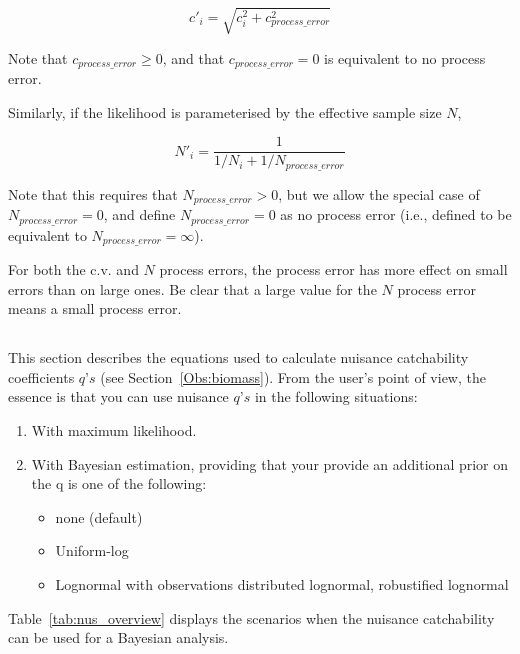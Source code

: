 {{{{\begin{equation}
  c'_i  = \sqrt {c_i^2  + c_{process\_error}^2 } 
\end{equation}

Note that $c_{process\_ error} \ge 0$, and that $c_{process\_ error} = 0$ is equivalent to no process error.

Similarly, if the likelihood is parameterised by the effective sample size $N$,

\begin{equation}
 N'_i  = \frac{1}{1 / {N_i}+ 1 / N_{process\_error}}
\end{equation}

Note that this requires that $N_{process\_ error} > 0$, but we allow the special case of $N_{process\_ error}=0$, and define $N_{process\_ error}=0$ as no process error (i.e., defined to be equivalent to $N_{process\_ error}=\infty$). 

For both the c.v. and $N$ process errors, the process error has more effect on small errors than on large ones. Be clear that a large value for the $N$ process error means a small process error.

\subsection{}\label{subsec:nuisance}
This section describes the equations used to calculate nuisance catchability coefficients $q’s$ (see Section~\ref{Obs:biomass}). From the user's point of view, the essence is that you can use nuisance $q’s$ in the following situations:
\begin{enumerate}
	\item With maximum likelihood.
	\item With Bayesian estimation, providing that your provide an additional prior on the q is one of the following:
		\begin{itemize} 
			\item none (default)
			\item Uniform-log
			\item Lognormal with observations distributed lognormal, robustified lognormal
		\end{itemize}
\end{enumerate}
Table~\ref{tab:nus_overview} displays the scenarios when the nuisance catchability can be used for a Bayesian analysis.

}}}}

